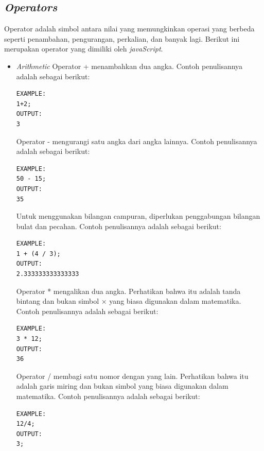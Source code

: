 \subsection{\textit{Operators}}
\label{sec: Operators}
   Operator adalah simbol antara nilai yang memungkinkan operasi yang berbeda seperti penambahan, pengurangan, perkalian, dan banyak lagi\cite{javascriptlearn}. Berikut ini merupakan operator yang dimiliki oleh \textit{javaScript}.
   \begin{itemize}
        \item \textit{Arithmetic}\newline
        Operator + menambahkan dua angka. Contoh penulisannya adalah sebagai berikut: 
        \begin{lstlisting}[basicstyle=\ttfamily, frame=single,
    columns=fullflexible, breaklines=true, numbers=none]
EXAMPLE:
1+2;
OUTPUT:
3
        \end{lstlisting}
        Operator - mengurangi satu angka dari angka lainnya. Contoh penulisannya adalah sebagai berikut: 
        \begin{lstlisting}[basicstyle=\ttfamily, frame=single,
    columns=fullflexible, breaklines=true, numbers=none]
EXAMPLE:
50 - 15;
OUTPUT:
35
        \end{lstlisting}
        Untuk menggunakan bilangan campuran, diperlukan penggabungan bilangan bulat dan pecahan. Contoh penulisannya adalah sebagai berikut:  
        \begin{lstlisting}[basicstyle=\ttfamily, frame=single,
    columns=fullflexible, breaklines=true, numbers=none]
EXAMPLE:
1 + (4 / 3);
OUTPUT:
2.333333333333333
        \end{lstlisting}
        Operator * mengalikan dua angka. Perhatikan bahwa itu adalah tanda bintang dan bukan simbol × yang biasa digunakan dalam matematika. Contoh penulisannya adalah sebagai berikut: 
        \begin{lstlisting}[basicstyle=\ttfamily, frame=single,
    columns=fullflexible, breaklines=true, numbers=none]
EXAMPLE:
3 * 12;
OUTPUT:
36
        \end{lstlisting}
        Operator / membagi satu nomor dengan yang lain. Perhatikan bahwa itu adalah garis miring dan bukan simbol yang biasa digunakan dalam matematika. Contoh penulisannya adalah sebagai berikut: 
        \begin{lstlisting}[basicstyle=\ttfamily, frame=single,
    columns=fullflexible, breaklines=true, numbers=none]
EXAMPLE:
12/4;
OUTPUT:
3;
        \end{lstlisting}

\end{itemize}
